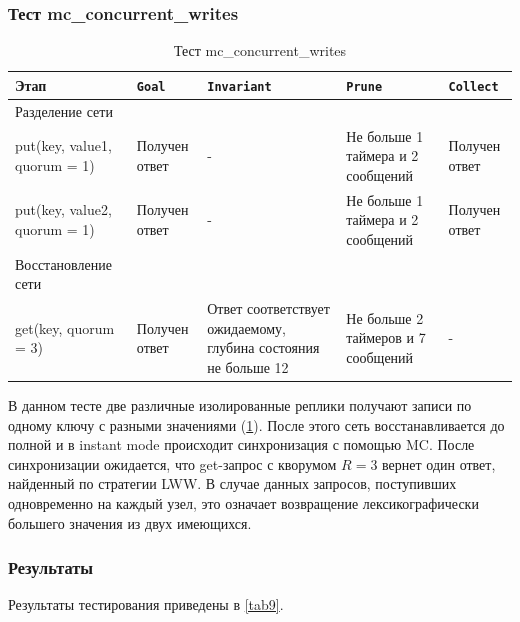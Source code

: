 \documentclass[a4paper,12pt]{extarticle}
\newcommand{\goal}[0]{\texttt{Goal}}
\newcommand{\prune}[0]{\texttt{Prune}}
\newcommand{\invariant}[0]{\texttt{Invariant}}
\newcommand{\collect}[0]{\texttt{Collect}}
\newcommand{\mc}[0]{MC}
\begin{document}
\subsubsection{Тест mc\_concurrent\_writes}
\label{kvreplication_test_3}

\begin{table}[htbp]
    \caption{Тест mc\_concurrent\_writes}
    \begin{center}
        \begin{tabular}{|p{}|p{}|p{}|p{}|p{} |}
            \hline
    Этап & \goal & \invariant & \prune & \collect \\
    \hline
    Разделение сети & & & &  \\
    \hline
    put(key, value1, quorum = 1)  & Получен ответ & - & Не больше 1 таймера и 2 сообщений & Получен ответ \\
    \hline
    put(key, value2, quorum = 1)  & Получен ответ & - & Не больше 1 таймера и 2 сообщений & Получен ответ \\
    \hline
    Восстановление сети & & & & \\
    \hline
    get(key, quorum = 3)  & Получен ответ & Ответ соответствует ожидаемому, глубина состояния не больше 12 & Не больше 2 таймеров и 7 сообщений  & - \\
    \hline
    \end{tabular}
    \label{testconcurrent}
    \end{center}
\end{table}

В данном тесте две различные изолированные реплики получают записи по одному ключу с разными значениями (\cref{testconcurrent}).
После этого сеть восстанавливается до полной и в instant mode происходит синхронизация с помощью \mc.
После синхронизации ожидается, что get-запрос с кворумом $R=3$ вернет один ответ, найденный по стратегии LWW.
В случае данных запросов, поступивших одновременно на каждый узел, это означает возвращение лексикографически большего значения из двух имеющихся. 

\subsubsection{Результаты}

Результаты тестирования приведены в \cref{tab9}.
\end{document}

